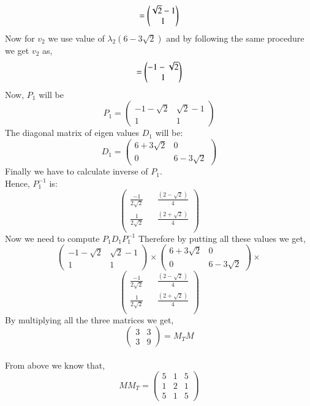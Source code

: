 \documentclass[journal,12pt,twocolumn]{IEEEtran}
\renewcommand\thesection{\arabic{section}}
\begin{document}
\begin{enumerate}[label=\thesection.\arabic*.,ref=\thesection.\theenumi]
\begin{align*}
=\begin{pmatrix}\sqrt{2}-1\\1\end{pmatrix}
\end{align*}
Now for $v_2$ we use value of $\lambda_2 (6-3\sqrt{2})$ and by following the same procedure we get $v_2$ as,
\begin{align*}
=\begin{pmatrix}-1-\sqrt{2}\\1\end{pmatrix}
\end{align*}
Now, $P_1$ will be \\
$$
P_1 =\begin{pmatrix}
-1-\sqrt{2} & \sqrt{2}-1\\
1 & 1
\end{pmatrix}
$$
The diagonal matrix of eigen values $D_1$ will be:
$$
D_1=\begin{pmatrix}
6+3\sqrt{2} & 0\\
0 & 6-3\sqrt{2}
\end{pmatrix}
$$  
Finally we have to calculate inverse of $P_1$.\\
Hence, $P_1^{-1}$ is:
$$
\begin{pmatrix}
\frac{-1}{2\sqrt{2}}  && \frac{(2-\sqrt{2})}{4}\\
\frac{1}{2\sqrt{2}}  && \frac{(2+\sqrt{2})}{4}\\
\end{pmatrix}
 $$
  Now we need to compute $P_1D_1P_1^{-1}$
  Therefore by putting all these values we get,
  $$
\begin{pmatrix}
-1-\sqrt{2} & \sqrt{2}-1\\
1 & 1
\end{pmatrix}
  \times
\begin{pmatrix}
6+3\sqrt{2} & 0\\
0 & 6-3\sqrt{2}
\end{pmatrix}
\times
$$
$$
\begin{pmatrix}
\frac{-1}{2\sqrt{2}}  && \frac{(2-\sqrt{2})}{4}\\
\frac{1}{2\sqrt{2}}  && \frac{(2+\sqrt{2})}{4}\\
\end{pmatrix}
$$
By multiplying all the three matrices we get,
$$
\begin{pmatrix}
3 & 3\\
3 & 9
\end{pmatrix} 
= M_TM
$$
\\
From above we know that,
$$
MM_T=\begin{pmatrix}
5 & 1& 5\\
1 & 2& 1\\
5 &1 & 5

\end{pmatrix}$$
\end{enumerate}
\end{document}
